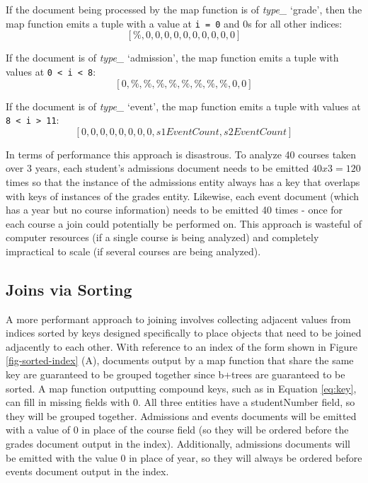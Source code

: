 If the document being processed by the map function is of \textit{type\_} ‘grade’, then the map function emits a tuple with a value at \texttt{i = 0} and 0s for all other indices: \[[\%, 0, 0, 0, 0, 0, 0, 0, 0, 0, 0]\]

If the document is of \textit{type\_} `admission', the map function emits a tuple with values at \texttt{0 < i < 8}: \[[0, \%, \%, \%, \%, \%, \%, \%, \%, 0, 0]\]

If the document is of \textit{type\_} ‘event’, the map function emits a tuple with values at \texttt{8 < i > 11}: \[[0, 0, 0, 0, 0, 0, 0, 0, s1EventCount, s2EventCount]\]

In terms of performance this approach is disastrous. To analyze 40 courses taken over 3 years, each student’s admissions document needs to be emitted $40 x 3 = 120$ times so that the instance of the admissions entity always has a key that overlaps with keys of instances of the grades entity. Likewise, each event document (which has a year but no course information) needs to be emitted 40 times - once for each course a join could potentially be performed on. This approach is wasteful of computer resources (if a single course is being analyzed) and completely impractical to scale (if several courses are being analyzed).

\subsection{Joins via Sorting}
A more performant approach to joining involves collecting adjacent values from indices sorted by keys designed specifically to place objects that need to be joined adjacently to each other. With reference to an index of the form shown in Figure \ref{fig-sorted-index} (A), documents output by a map function that share the same key are guaranteed to be grouped together since b+trees are guaranteed to be sorted. A map function outputting compound keys, such as in Equation \ref{eq:key}, can fill in missing fields with $0$. All three entities have a studentNumber field, so they will be grouped together. Admissions and events documents will be emitted with a value of $0$ in place of the course field (so they will be ordered before the grades document output in the index). Additionally, admissions documents will be emitted with the value $0$ in place of year, so they will always be ordered before events document output in the index.

